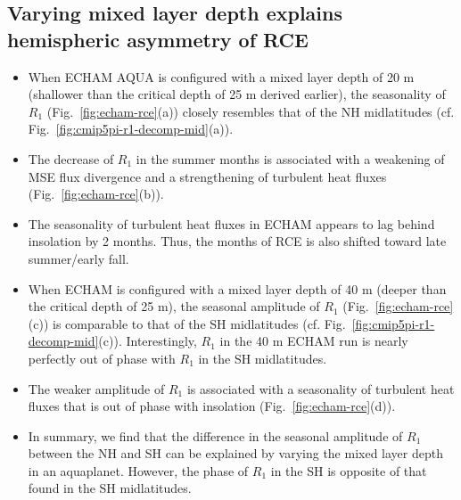 \documentclass{ametsocV5}
\begin{document}
\subsection{Varying mixed layer depth explains hemispheric asymmetry of RCE}
\begin{itemize}
  \item When ECHAM AQUA is configured with a mixed layer depth of 20 m (shallower than the critical depth of 25 m derived earlier), the seasonality of \(R_{1}\) (Fig.~\ref{fig:echam-rce}(a)) closely resembles that of the NH midlatitudes (cf. Fig.~\ref{fig:cmip5pi-r1-decomp-mid}(a)).
  \item The decrease of \(R_{1}\) in the summer months is associated with a weakening of MSE flux divergence and a strengthening of turbulent heat fluxes (Fig.~\ref{fig:echam-rce}(b)).
  \item The seasonality of turbulent heat fluxes in ECHAM appears to lag behind insolation by 2 months. Thus, the months of RCE is also shifted toward late summer/early fall.
  \item When ECHAM is configured with a mixed layer depth of 40 m (deeper than the critical depth of 25 m), the seasonal amplitude of \(R_{1}\) (Fig.~\ref{fig:echam-rce}(c)) is comparable to that of the SH midlatitudes (cf. Fig.~\ref{fig:cmip5pi-r1-decomp-mid}(c)). Interestingly, \(R_{1}\) in the 40 m ECHAM run is nearly perfectly out of phase with \(R_{1}\) in the SH midlatitudes.
  \item The weaker amplitude of \(R_{1}\) is associated with a seasonality of turbulent heat fluxes that is out of phase with insolation (Fig.~\ref{fig:echam-rce}(d)).
  \item In summary, we find that the difference in the seasonal amplitude of \(R_{1}\) between the NH and SH can be explained by varying the mixed layer depth in an aquaplanet. However, the phase of \(R_{1}\) in the SH is opposite of that found in the SH midlatitudes.
\end{itemize}
\end{document}
